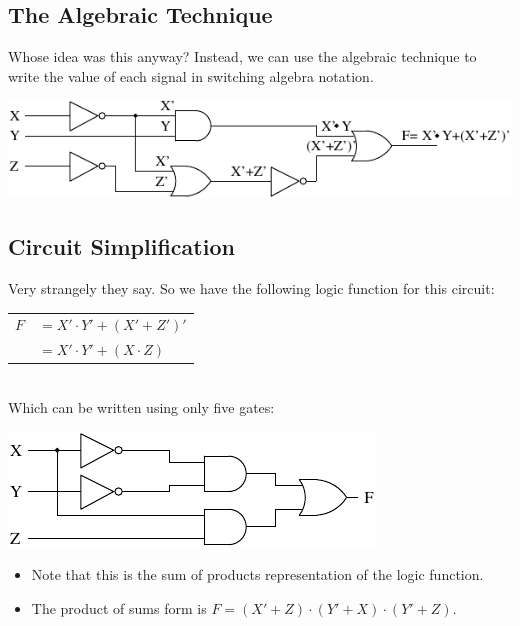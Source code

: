 \subsection{The Algebraic Technique}

\begin{frame}{Whose idea was this anyway?}
  Instead, we can use the algebraic technique to write the value of each signal in switching algebra notation.\\
  \begin{center}
    \includegraphics{AnalysisLogicDiagramBooleanAlgebra}
  \end{center}
\end{frame}

\subsection{Circuit Simplification}

\begin{frame}{Very strangely they say.}
  So we have the following logic function for this circuit:\\
  \begin{tabular}{rl}
    $F$ & $= X' \cdot Y' + (X' + Z')'$ \\
        & $=X' \cdot Y' + (X \cdot Z)$ \\
  \end{tabular}\\
  Which can be written using only five gates:\\
  \begin{center}
    \includegraphics{AnalysisLogicDiagramSimplified}
  \end{center}
\end{frame}

\begin{itemize}
  \item Note that this is the sum of products representation of the logic function.
  \item The product of sums form is $F = (X' + Z) \cdot (Y' + X) \cdot (Y' + Z)$.
\end{itemize}

